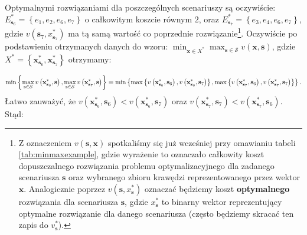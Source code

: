 Optymalnymi rozwiązaniami dla poszczególnych scenariuszy są oczywiście: $E^{\ast}_{\textbf{s}_{6}} = \left\{ e_{1}, e_{2}, e_{6}, e_{7} \right\}$ o całkowitym koszcie równym $2$, oraz $E^{\ast}_{\textbf{s}_{7}} = \left\{ e_{3}, e_{4}, e_{6}, e_{7} \right\}$, gdzie $v \left( \textbf{s}_{7}, x^{\ast}_{\textbf{s}_{7}} \right)$ ma tą samą wartość co poprzednie rozwiązanie\footnote{Z oznaczeniem $v \left( \textbf{s}, \textbf{x} \right)$ spotkaliśmy się już wcześniej przy omawianiu tabeli \ref{tab:minmaxexample}, gdzie wyrażenie to oznaczało całkowity koszt dopuszczalnego rozwiązania problemu optymalizacyjnego dla zadanego scenariusza $\textbf{s}$ oraz wybranego zbioru krawędzi reprezentowanego przez wektor $\textbf{x}$. Analogicznie poprzez $v \left( \textbf{s}, x^{\ast}_{\textbf{s}} \right)$ oznaczać będziemy koszt \textbf{optymalnego} rozwiązania dla scenariusza $\textbf{s}$, gdzie $x^{\ast}_{\textbf{s}}$ to binarny wektor reprezentujący optymalne rozwiązanie dla danego scenariusza (często będziemy skracać ten zapis do $v^{\ast}_{\textbf{s}}$).}. Oczywiście po podstawieniu otrzymanych danych do wzoru: $\min_{\textbf{x} \in X^{\ast}} \max_{\textbf{s} \in \mathcal{S}} v \left( \textbf{x}, \textbf{s} \right)$, gdzie $X^{\ast} = \left\{ \textbf{x}^{\ast}_{\textbf{s}_{6}}, \textbf{x}^{\ast}_{\textbf{s}_{7}} \right\}$ otrzymamy:

\begin{equation*}
	\min \left\{ \max_{ \mathclap{\textbf{s} \in \mathcal{S}}} v \left( \textbf{x}^{\ast}_{\textbf{s}_{6}}, \textbf{s} \right), \max_{\mathclap{\textbf{s} \in \mathcal{S}}} v \left( \textbf{x}^{\ast}_{\textbf{s}_{7}}, \textbf{s} \right)  \right\} = \min \left\{ \max \left\{ v \left( \textbf{x}^{\ast}_{\textbf{s}_{6}}, \textbf{s}_{6} \right), v \left( \textbf{x}^{\ast}_{\textbf{s}_{6}}, \textbf{s}_{7} \right) \right\}, \max \left\{ v \left( \textbf{x}^{\ast}_{\textbf{s}_{7}}, \textbf{s}_{6} \right), v \left( \textbf{x}^{\ast}_{\textbf{s}_{7}}, \textbf{s}_{7} \right) \right\} \right\}\text{.}
\end{equation*}
Łatwo zauważyć, że $v \left( \textbf{x}^{\ast}_{\textbf{s}_{6}}, \textbf{s}_{6} \right) < v \left( \textbf{x}^{\ast}_{\textbf{s}_{6}}, \textbf{s}_{7} \right)$ oraz $v \left( \textbf{x}^{\ast}_{\textbf{s}_{7}}, \textbf{s}_{7} \right) < v \left( \textbf{x}^{\ast}_{\textbf{s}_{7}}, \textbf{s}_{6} \right)$. Stąd:


